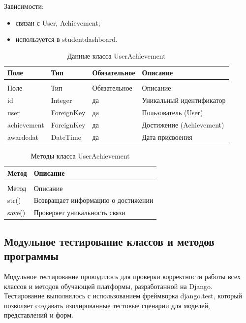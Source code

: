 Зависимости:
	\begin{itemize}
		\item связан с User, Achievement;
		\item используется в studentdashboard.
	\end{itemize}


\begin{xltabular}{\textwidth}{|l|l|l|X|}
	\caption{Данные класса UserAchievement\label{tab:userachievement_attributes}}\\
	\hline
	Поле & Тип & Обязательное & Описание \\ \hline
	\endfirsthead
	\\
	\hline
	Поле & Тип & Обязательное & Описание \\ \hline
	\endhead
	id & Integer & да & Уникальный идентификатор \\ \hline
	user & ForeignKey & да & Пользователь (User) \\ \hline
	achievement & ForeignKey & да & Достижение (Achievement) \\ \hline
	awardedat & DateTime & да & Дата присвоения \\ \hline
\end{xltabular}

\begin{xltabular}{\textwidth}{|l|X|}
	\caption{Методы класса UserAchievement\label{tab:userachievement_methods}}\\
	\hline
	Метод & Описание \\ \hline
	\endfirsthead
	\\
	\hline
	Метод & Описание \\ \hline
	\endhead
	str() & Возвращает информацию о достижении \\ \hline
	save() & Проверяет уникальность связи \\ \hline
\end{xltabular}

\subsection{Модульное тестирование классов и методов программы}

Модульное тестирование проводилось для проверки корректности работы всех классов и методов обучающей платформы, разработанной на Django. Тестирование выполнялось с использованием фреймворка django.test, который позволяет создавать изолированные тестовые сценарии для моделей, представлений и форм.

